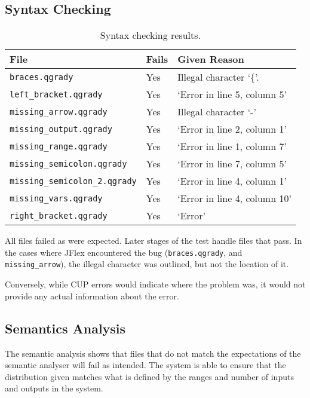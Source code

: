 \documentclass[report.tex]{subfiles}
\begin{document}
\subsection{Syntax Checking} %
\label{sub:syntax_checking_res}
\begin{table}[H]
    \centering
    \begin{tabular}{l | l | l}
    File & Fails & Given Reason \\
    \hline
    \texttt{braces.qgrady} & Yes & Illegal character `\{'. \\
    \texttt{left\_bracket.qgrady} & Yes & `Error in line 5, column 5' \\
    \texttt{missing\_arrow.qgrady} & Yes & Illegal character `-' \\
    \texttt{missing\_output.qgrady} & Yes & `Error in line 2, column 1' \\
    \texttt{missing\_range.qgrady} & Yes & `Error in line 1, column 7' \\
    \texttt{missing\_semicolon.qgrady} & Yes & `Error in line 7, column 5' \\
    \texttt{missing\_semicolon\_2.qgrady} & Yes & `Error in line 4, column 1' \\
    \texttt{missing\_vars.qgrady} & Yes & `Error in line 4, column 10' \\
    \texttt{right\_bracket.qgrady} & Yes & `Error' \\
    \hline
    \end{tabular}
    \caption{Syntax checking results.}
    \label{tab:syntax_result}
\end{table}

All files failed as were expected. Later stages of the test handle files that
pass. In the cases where JFlex encountered the bug (\texttt{braces.qgrady}, and
\texttt{missing\_arrow}),
the illegal character was outlined, but not the location of it.

Conversely, while CUP errors would indicate where the problem was, it would not
provide any actual information about the error.
\newpage
\subsection{Semantics Analysis} %
\label{sub:semantics_analysis}
The semantic analysis shows that files that do not match the expectations of the
semantic analyser will fail as intended. The system is able to ensure that
the distribution given matches what is defined by the ranges and number of
inputs and outputs in the system.
\end{document}
